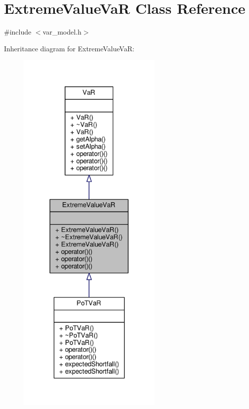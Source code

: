 \hypertarget{classExtremeValueVaR}{}\section{Extreme\+Value\+VaR Class Reference}
\label{classExtremeValueVaR}


{\ttfamily \#include $<$var\+\_\+model.\+h$>$}



Inheritance diagram for Extreme\+Value\+VaR\+:
\nopagebreak
\begin{figure}[H]
\begin{center}
\leavevmode
\includegraphics[width=199pt]{classExtremeValueVaR__inherit__graph}
\end{center}
\end{figure}


